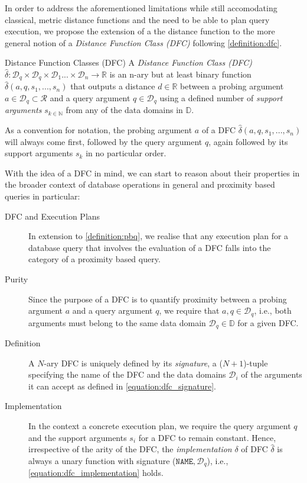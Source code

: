 In order to address the aforementioned limitations while still accomodating classical, metric distance functions and the need to be able to plan query execution, we propose the extension of a the distance function to the more general notion of a \emph{Distance Function Class (DFC)} following \cref{definition:dfc}.

\begin{definition}[label=definition:dfc]{Distance Function Classes (DFC)}{}
    A \emph{Distance Function Class (DFC)} $\hat{\delta} \colon \mathcal{D}_q \times \mathcal{D}_q \times \mathcal{D}_{1} ... \times \mathcal{D}_{n} \to \mathbb{R}$ is an n-ary but at least binary function $\hat{\delta}(a,q,s_1,...,s_n)$ that outputs a distance $d \in \mathbb{R}$ between a probing argument $a \in \mathcal{D}_q \subset \mathcal{R}$ and a query argument $q \in \mathcal{D}_q$ using a defined number of \emph{support arguments} $s_{k \in \mathbb{N}}$ from any of the data domains in $\mathbb{D}$.
\end{definition}

As a convention for notation, the probing argument $a$ of a DFC $\hat{\delta}(a,q,s_1,...,s_n)$ will always come first, followed by the query argument $q$, again followed by its support arguments $s_k$ in no particular order. 

With the idea of a DFC in mind, we can start to reason about their properties in the broader context of database operations in general and proximity based queries in particular:

\begin{description}

    \item[DFC and Execution Plans] In extension to \cref{definition:pbq}, we realise that any execution plan for a database query that involves the evaluation of a DFC falls into the category of a proximity based query.

    \item[Purity] Since the purpose of a DFC is to quantify proximity between a probing argument $a$ and a query argument $q$, we require that $a, q \in \mathcal{D}_q$, i.e., both arguments must belong to the same data domain $\mathcal{D}_q \in \mathbb{D}$ for a given DFC.

    \item[Definition] A $N$-ary DFC is uniquely defined by its \emph{signature}, a ($N+1$)-tuple specifying the name of the DFC and the data domains $\mathcal{D}_i$ of the arguments it can accept as defined in \cref{equation:dfc_signature}. 

    \item[Implementation] In the context a concrete execution plan, we require the query argument $q$ and the support arguments $s_i$ for a DFC to remain constant. Hence, irrespective of the arity of the DFC, the \emph{implementation} $\delta$ of DFC $\hat{\delta}$ is always a unary function with signature ($\mathtt{NAME}, \mathcal{D}_q$), i.e., \cref{equation:dfc_implementation} holds.
\end{description}

